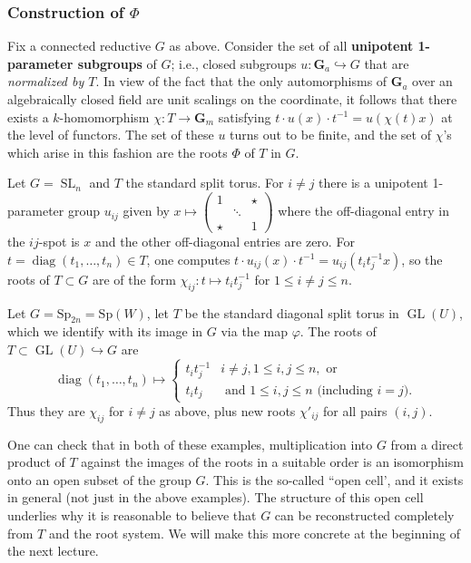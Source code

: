\documentclass[10pt]{article}
\renewcommand{\phi}{\varphi}
\newcommand{\GL}{\operatorname{GL}}
\newcommand{\SL}{\operatorname{SL}}
\renewcommand{\(}{\left(}
\renewcommand{\)}{\right)}
\newcommand{\into}{\hookrightarrow}
\newcommand{\diag}{\operatorname{diag}}
\newcommand{\Sp}{\mathrm{Sp}}
\numberwithin{thm}{subsection}
\begin{document}
\subsubsection{Construction of $\Phi$}
Fix a connected reductive $G$ as above.
Consider the set of all \textbf{unipotent 1-parameter subgroups} of $G$; 
i.e., closed subgroups $u:\mathbf{G}_a \hookrightarrow G$ that are \textit{normalized by $T$}.
In view of the fact that the only automorphisms of $\mathbf{G}_a$ over an algebraically
closed field are unit scalings on the coordinate, it follows that 
there exists a $k$-homomorphism $\chi:T\to \mathbf{G}_m$ 
satisfying $t\cdot u(x)\cdot t^{-1}=u(\chi(t)x)$ at the level of functors. 
The set of these $u$ turns out to be finite, and the set of $\chi$'s 
which arise in this fashion are the roots $\Phi$ of $T$ in $G$.
\begin{ex}
Let $G=\SL_n$ and $T$ the standard split torus.
For $i\neq j$ there is a unipotent 1-parameter group $u_{ij}$
given by $x\mapsto\(\begin{smallmatrix}1&&\star\\&\ddots&\\ \star&&1\end{smallmatrix}\)$
where the off-diagonal entry in the $ij$-spot is $x$ and the other off-diagonal entries are zero.
For $t=\diag(t_1,\ldots, t_n)\in T$, one computes $t\cdot u_{ij}(x)\cdot t^{-1}=u_{ij}(t_it_j^{-1}x)$,
so the roots of $T\subset G$
are of the form $\chi_{ij}:t\mapsto t_it_j^{-1}$ for $1 \le i\neq j \le n$. 
\end{ex}
\begin{ex}Let $G=\Sp_{2n}=\Sp(W)$,
let $T$ be the standard diagonal split torus in $\GL(U)$,
which we identify with its image in $G$ via the map $\phi$.
The roots of $T\subset \GL(U)\into G$
are \[\diag(t_1,\ldots, t_n)\mapsto\begin{cases}t_it_j^{-1}&i\neq j, 1\leq i,j\leq n,\text{ or }\\
t_it_j&\text{ and }1\leq i,j\leq n\text{ (including $i=j$)}.\end{cases}\]
Thus they are $\chi_{ij}$ for $i\neq j$ as above,
plus new roots $\chi'_{ij}$ for all pairs $(i,j)$.
\end{ex}
One can check that in both of these examples, multiplication
into $G$ from a direct product of $T$ against the images of the roots in a suitable order
is an isomorphism onto an open subset of the group $G$.  This is the so-called
``open cell', and it exists in general (not just in the above examples).
The structure of this open cell underlies why it is reasonable to believe
that $G$ can be reconstructed completely from $T$ and the root system. 
We will make this more concrete at the beginning of the next lecture. 
\end{document}
